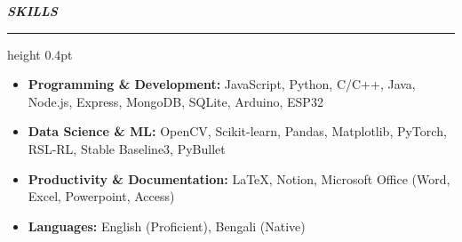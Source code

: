 {\noindent\fontsize{13pt}{16pt}\bfseries\itshape SKILLS\par}
\vspace{0.5em}
{\color{lightgray}\hrule height 0.4pt}
\vspace{0.7em}

\noindent
\begin{itemize}
    \item \textbf{Programming \& Development:} JavaScript, Python, C/C++, Java, Node.js, Express, MongoDB, SQLite, Arduino, ESP32
    \item \textbf{Data Science \& ML:} OpenCV, Scikit-learn, Pandas, Matplotlib, PyTorch, RSL-RL, Stable Baseline3, PyBullet
    \item \textbf{Productivity \& Documentation:} LaTeX, Notion, Microsoft Office (Word, Excel, Powerpoint, Access)
    \item \textbf{Languages:} English (Proficient), Bengali (Native)
\end{itemize}
